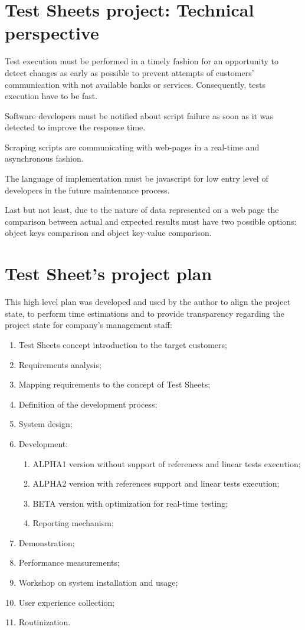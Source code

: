 \section{Test Sheets project: Technical perspective}
Test execution must be performed in a timely fashion for an opportunity to detect changes as early as possible to prevent attempts of customers' communication with not available banks or services. Consequently, tests execution have to be fast.


Software developers must be notified about script failure as soon as it was detected to improve the response time. 

Scraping scripts are communicating with web-pages in a real-time and asynchronous fashion.


The language of implementation must be javascript for low entry level of developers in the future maintenance process.

Last but not least, due to the nature of data represented on a web page the comparison between actual and expected results must have two possible options: object keys comparison and object key-value comparison.

\section{Test Sheet's project plan}
 This high level plan was developed and used by the author to align the project state, to perform time estimations and to provide transparency regarding the project state for company's management staff:
\begin{enumerate}
	\item Test Sheets concept introduction to the target customers;
	\item Requirements analysis;
	\item Mapping requirements to the concept of Test Sheets;
	\item Definition of the development process;
	\item System design;
	\item Development:
	\begin{enumerate}
		\item ALPHA1 version without support of references and linear tests execution;
		\item ALPHA2 version with references support and linear tests execution;
		\item BETA version with optimization for real-time testing;
		\item Reporting mechanism;
	\end{enumerate}
		\item Demonstration;
		\item Performance measurements;
		\item Workshop on system installation and usage;
		\item User experience collection;
		\item Routinization.
\end{enumerate}

